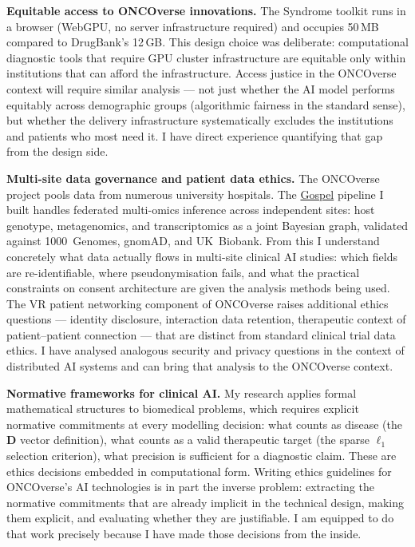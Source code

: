 \documentclass[12pt,a4paper]{article}
\begin{document}
\textbf{Equitable access to ONCOverse innovations.}
The Syndrome toolkit runs in a browser (WebGPU, no server infrastructure required)
and occupies 50\,MB compared to DrugBank's 12\,GB.
This design choice was deliberate: computational diagnostic tools that require
GPU cluster infrastructure are equitable only within institutions that can afford
the infrastructure.
Access justice in the ONCOverse context will require similar analysis ---
not just whether the AI model performs equitably across demographic groups
(algorithmic fairness in the standard sense), but whether the delivery
infrastructure systematically excludes the institutions and patients who
most need it.
I have direct experience quantifying that gap from the design side.

\textbf{Multi-site data governance and patient data ethics.}
The ONCOverse project pools data from numerous university hospitals.
The \href{https://github.com/fullscreen-triangle/gospel}{Gospel} pipeline
I built handles federated multi-omics inference across independent sites:
host genotype, metagenomics, and transcriptomics as a joint Bayesian graph,
validated against 1000~Genomes, gnomAD, and UK~Biobank.
From this I understand concretely what data actually flows in multi-site
clinical AI studies: which fields are re-identifiable, where pseudonymisation
fails, and what the practical constraints on consent architecture are
given the analysis methods being used.
The VR patient networking component of ONCOverse raises additional ethics
questions --- identity disclosure, interaction data retention, therapeutic
context of patient--patient connection --- that are distinct from
standard clinical trial data ethics.
I have analysed analogous security and privacy questions in the context
of distributed AI systems and can bring that analysis to the ONCOverse context.

\textbf{Normative frameworks for clinical AI.}
My research applies formal mathematical structures to biomedical problems,
which requires explicit normative commitments at every modelling decision:
what counts as disease (the $\mathbf{D}$ vector definition),
what counts as a valid therapeutic target (the sparse $\ell_1$ selection criterion),
what precision is sufficient for a diagnostic claim.
These are ethics decisions embedded in computational form.
Writing ethics guidelines for ONCOverse's AI technologies is in part
the inverse problem: extracting the normative commitments that are already
implicit in the technical design, making them explicit, and evaluating
whether they are justifiable.
I am equipped to do that work precisely because I have made those decisions
from the inside.
\end{document}
